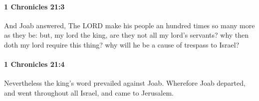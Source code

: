 		\paragraph{1 Chronicles 21:3} %
			\label{1CHRONICLES-21-3}

			And Joab answered, The LORD make his people an hundred times so many more as they be: but, my lord the king, are they not all my lord’s servants? why then doth my lord require this thing? why will he be a cause of trespass to Israel?


		\paragraph{1 Chronicles 21:4} %
			\label{1CHRONICLES-21-4}

			Nevertheless the king’s word prevailed against Joab. Wherefore Joab departed, and went throughout all Israel, and came to Jerusalem.


